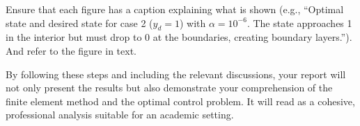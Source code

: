 \documentclass[a4paper,10pt]{article}
\begin{document}
Ensure that each figure has a caption explaining what is shown (e.g., “Optimal state and desired state for case 2 (\(y_d=1\)) with \(\alpha=10^{-6}\). The state approaches 1 in the interior but must drop to 0 at the boundaries, creating boundary layers.”). And refer to the figure in text.

By following these steps and including the relevant discussions, your report will not only present the results but also demonstrate your comprehension of the finite element method and the optimal control problem. It will read as a cohesive, professional analysis suitable for an academic setting.
\end{document}

